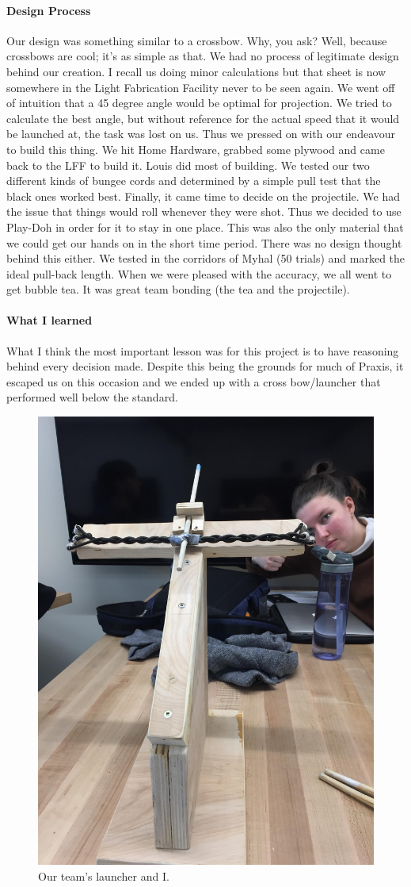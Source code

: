 \documentclass[paper=a4, fontsize=11pt]{article} %
\begin{document}
    \paragraph{Design Process}
    Our design was something similar to a crossbow. Why, you ask? Well, because crossbows are cool; it's as simple as that. We had no process of legitimate design behind our creation. I recall us doing minor calculations but that sheet is now somewhere in the Light Fabrication Facility never to be seen again. We went off of intuition that a 45 degree angle would be optimal for projection. We tried to calculate the best angle, but without reference for the actual speed that it would be launched at, the task was lost on us. Thus we pressed on with our endeavour to build this thing. We hit Home Hardware, grabbed some plywood and came back to the LFF to build it. Louis did most of building. We tested our two different kinds of bungee cords and determined by a simple pull test that the black ones worked best. Finally, it came time to decide on the projectile. We had the issue that things would roll whenever they were shot. Thus we decided to use Play-Doh in order for it to stay in one place. This was also the only material that we could get our hands on in the short time period. There was no design thought behind this either. We tested in the corridors of Myhal (50 trials) and marked the ideal pull-back length. When we were pleased with the accuracy, we all went to get bubble tea. It was great team bonding (the tea and the projectile).
    \paragraph{What I learned}
    What I think the most important lesson was for this project is to have reasoning behind every decision made. Despite this being the grounds for much of Praxis, it escaped us on this occasion and we ended up with a cross bow/launcher that performed well below the standard. 
    \begin{figure}[H]
        \centering
        \includegraphics[width=0.5\linewidth]{launch2.jpg}
        \caption{Our team's launcher and I.}
    \end{figure}
\end{document}
